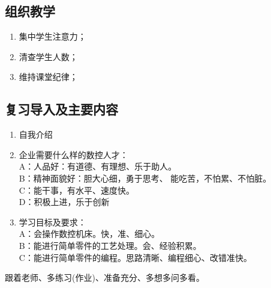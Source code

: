 \jxhj{%
	 }

\makeshouye %

\subsection{组织教学}
\begin{enumerate}[\hspace{2em}1、]
	\setlength{\itemsep}{0pt}
	\item 集中学生注意力；
	\item 清查学生人数；
	\item 维持课堂纪律；
\end{enumerate}
\subsection{复习导入及主要内容}
\begin{enumerate}[\hspace{2em}1、]
\item 自我介绍
\item 企业需要什么样的数控人才：\\
A：人品好：有道德、有理想、乐于助人。\\
B：精神面貌好：胆大心细，勇于思考、
能吃苦，不怕累、不怕脏。\\
C：能干事，有水平、速度快。\\
D：积极上进，乐于创新
\item 学习目标及要求：\\
A：会操作数控机床。快，准、细心。\\
B：能进行简单零件的工艺处理。会、经验积累。 \\
C：能进行简单零件的编程。思路清晰、编程细心、改错准快。\\
\end{enumerate}
跟着老师、多练习(作业)、准备充分、多想多问多看。
